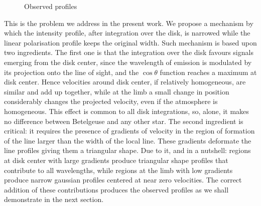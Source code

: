 \documentclass{/Users/art2/TeX/aanda/aa}
\def\kms {km\,s$^{-1}$}
\begin{document}
\begin{figure}
   \caption{Observed profiles }
   \label{obsprofiles}
   \end{figure}

This is the problem we address in the present work. We propose a mechanism by which the intensity profile, after integration over the disk, is narrowed 
while the linear polarisation profile keeps the original width. Such mechanism is based upon two ingredients. The first one is  that the integration 
over the disk favours signals emerging from the disk center, since the wavelength of emission is modulated by its projection onto the line of sight, and the
$\cos \theta$ function reaches a maximum at disk center. Hence velocities around  disk center, if relatively homogeneous, are similar and add up together, while at 
the limb a small change in position considerably changes the projected velocity, even if the atmosphere is homogeneous. This effect is common to all disk integrations, so, alone, 
it makes no difference between Betelgeuse and any other star. The second ingredient is critical: it requires the presence of gradients of velocity 
in the region of formation of the line larger than the width of the local line. These gradients deformate the line profiles giving them a triangular 
shape. Due to it, and in a nutshell: regions at disk center with large gradients produce  triangular shape profiles that contribute to all wavelengths, while 
regions at the limb with low gradients produce narrow gaussian profiles centered at near zero velocities. The correct addition of these contributions 
produces the observed profiles as we shall demonstrate in the next section. 
\end{document}
